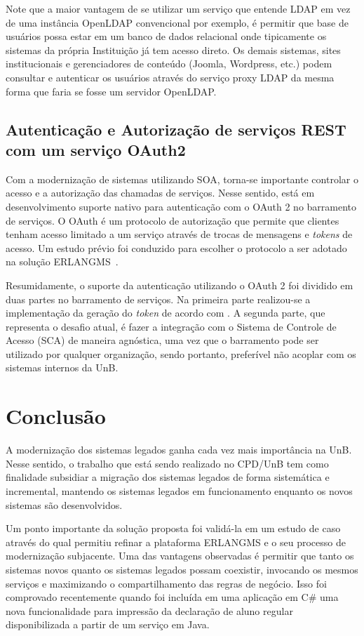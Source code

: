 \documentclass[12pt]{article}
\begin{document}
Note que a maior vantagem de se utilizar um serviço que entende LDAP
em vez de uma instância OpenLDAP convencional por exemplo, 
é permitir que base de usuários possa
estar em um banco de dados relacional onde tipicamente os sistemas da própria Instituição
já tem acesso direto. Os demais sistemas, sites institucionais 
e gerenciadores de conteúdo (Joomla, Wordpress, etc.)
podem consultar e autenticar os usuários através do serviço proxy LDAP 
da mesma forma que faria se fosse um servidor OpenLDAP.



\subsection{Autenticação e Autorização de serviços REST com um serviço OAuth2}\label{oauth2}

Com a modernização de sistemas utilizando SOA, torna-se
importante controlar o acesso e a autorização das chamadas de serviços.
Nesse sentido, está em desenvolvimento suporte nativo para autenticação com o OAuth 2 no barramento de serviços. 
O OAuth é um protocolo de autorização 
que permite que clientes tenham 
acesso limitado a um serviço através de trocas de 
mensagens e \textit{tokens} de acesso. Um estudo prévio foi conduzido para
escolher o protocolo a ser adotado
na solução ERLANGMS~\cite{7521451}.


Resumidamente, o suporte da autenticação utilizando o OAuth 2 foi dividido em duas partes no barramento de serviços.
Na primeira parte realizou-se a implementação
da geração do \textit{token} de acordo com \cite{hardt2012oauth}.
A segunda parte, que representa 
o desafio atual, é fazer a integração com o Sistema de Controle de Acesso (SCA)
de maneira agnóstica, uma vez que o barramento pode ser utilizado 
por qualquer organização, sendo portanto, preferível não acoplar com 
os sistemas internos da UnB.




\section{Conclusão}

A modernização dos sistemas legados ganha cada vez mais importância
na UnB. Nesse sentido, o trabalho que está sendo realizado
no CPD/UnB tem como finalidade subsidiar
a migração
dos sistemas legados de forma sistemática 
e incremental, mantendo os sistemas legados
em funcionamento enquanto os novos sistemas
são desenvolvidos.

Um ponto importante
da solução proposta foi validá-la em um estudo de caso
através do qual permitiu refinar a plataforma ERLANGMS e o seu processo de modernização subjacente.
Uma das vantagens observadas é permitir que tanto 
os sistemas novos quanto os sistemas legados possam coexistir, 
invocando os mesmos serviços e
maximizando o compartilhamento das regras de negócio. Isso foi comprovado 
recentemente quando foi incluída em uma aplicação em C\# uma nova funcionalidade
para impressão da declaração de aluno regular disponibilizada a partir de um serviço em Java.




\end{document}
